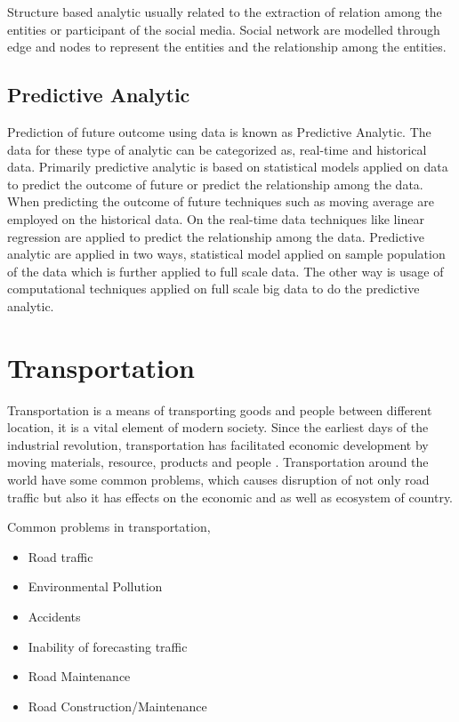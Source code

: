 \documentclass[sigconf]{acmart}
\begin{document}
Structure based analytic usually related to the extraction of relation among the entities or participant of the social media. Social network are modelled through edge and nodes to represent the entities and the relationship among the entities.



\subsection{Predictive Analytic}

Prediction of future outcome using data is known as Predictive Analytic. The data for these type of analytic can be categorized as, real-time and historical data. Primarily predictive analytic is based on statistical models applied on data to predict the outcome of future or predict the relationship among the data. When predicting the outcome of future techniques such as moving average are employed on the historical data. On the real-time data techniques like linear regression are applied to predict the relationship among the data. Predictive analytic are applied in two ways, statistical model applied on sample population of the data which is further applied to full scale data. The other way is usage of computational techniques applied on full scale big data to do the predictive analytic.  
 
\section{Transportation}

Transportation is a means of transporting goods and people between different location, it is a vital element of modern society. Since the earliest days of the industrial revolution, transportation has facilitated economic development by moving materials, resource, products and people \cite{trans}. Transportation around the world have some common problems, which causes disruption of not only road traffic but also it has effects on the economic and as well as ecosystem of country.

Common problems in transportation,

\begin{itemize}
\item Road traffic
\item Environmental Pollution
\item Accidents
\item Inability of forecasting traffic
\item Road Maintenance
\item Road Construction/Maintenance 
\end{itemize}
\end{document}
